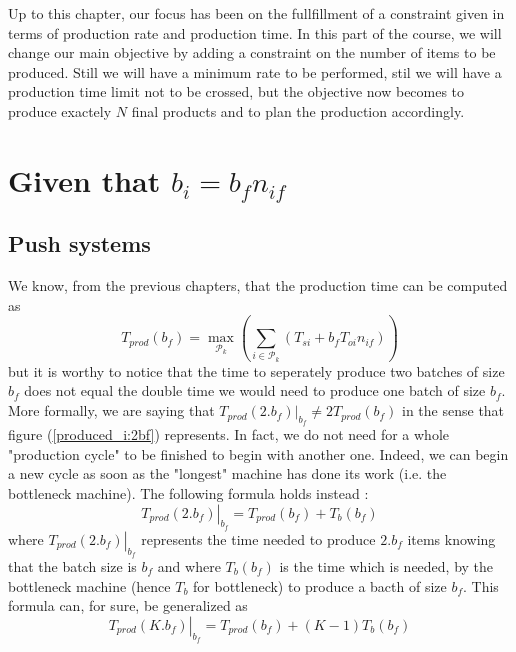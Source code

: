 Up to this chapter, our focus has been on the fullfillment of a constraint given in terms of production rate and production time. In this part of the course, we will change our main objective by adding a constraint on the number of items to be produced. Still we will have a minimum rate to be performed, stil we will have a production time limit not to be crossed, but the objective now becomes to produce exactely $N$ final products and to plan the production accordingly. 

\section{Given that $b_i = b_fn_{if}$}

\subsection{Push systems}

We know, from the previous chapters, that the production time can be computed as \[ T_{prod}(b_f) = \max_{\mathcal P_k}\left( \sum_{i\in\mathcal P_k}(T_{si} + b_fT_{oi}n_{if}) \right) \] but it is worthy to notice that the time to seperately produce two batches of size $b_f$ does not equal the double time we would need to produce one batch of size $b_f$. More formally, we are saying that $T_{prod}(2.b_f)|_{b_f}\ne 2T_{prod}(b_f)$ in the sense that figure (\ref{produced_i:2bf}) represents. In fact, we do not need for a whole "production cycle" to be finished to begin with another one. Indeed, we can begin a new cycle as soon as the "longest" machine has done its work (i.e. the bottleneck machine). The following formula holds instead : \[ \left. T_{prod}(2.b_f) \right|_{b_f} = T_{prod}(b_f) + T_b(b_f) \] where $\left. T_{prod}(2.b_f) \right|_{b_f}$ represents the time needed to produce $2.b_f$ items knowing that the batch size is $b_f$ and where $T_b(b_f)$ is the time which is needed, by the bottleneck machine (hence $T_b$ for bottleneck) to produce a bacth of size $b_f$. This formula can, for sure, be generalized as \begin{equation} \left. T_{prod}(K.b_f) \right|_{b_f} = T_{prod}(b_f) + (K-1)T_b(b_f) \label{produced_i:tprod} \end{equation}

